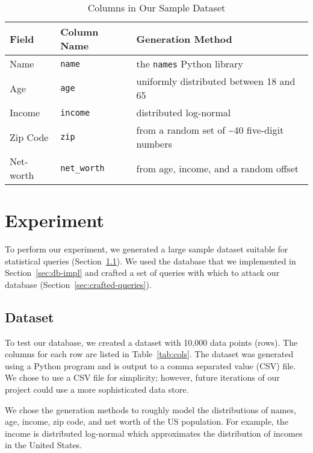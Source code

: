 \documentclass[conference,11pt]{IEEEtran}
\begin{document}
\begin{table*}[h]
    \caption{Columns in Our Sample Dataset}\label{tab:cols}
    \centering
    \begin{tabular}{l | l | l}
        \textbf{Field} & \textbf{Column Name} & \textbf{Generation Method} \\
        \hline
        Name & \texttt{name} & the \texttt{names} Python library \\
        Age & \texttt{age} & uniformly distributed between 18 and 65 \\
        Income & \texttt{income} & distributed log-normal \\
        Zip Code & \texttt{zip} & from a random set of \textasciitilde40
            five-digit numbers \\
        Net-worth & \texttt{net\_worth} & from age, income, and a random offset
    \end{tabular}
\end{table*}

\section{Experiment}\label{sec:experiment}
To perform our experiment, we generated a large sample dataset suitable for
statistical queries (Section~\ref{sec:dataset}). We used the database that we
implemented in Section~\ref{sec:db-impl} and crafted a set of queries with which
to attack our database (Section~\ref{sec:crafted-queries}).

\subsection{Dataset}\label{sec:dataset}
To test our database, we created a dataset with 10,000 data points (rows). The
columns for each row are listed in Table~\vref{tab:cols}.  The dataset was
generated using a Python program and is output to a comma separated value (CSV)
file. We chose to use a CSV file for simplicity; however, future iterations of
our project could use a more sophisticated data store.

We chose the generation methods to roughly model the distributions of names,
age, income, zip code, and net worth of the US population. For example, the
income is distributed log-normal which approximates the distribution of incomes
in the United States.
\end{document}
